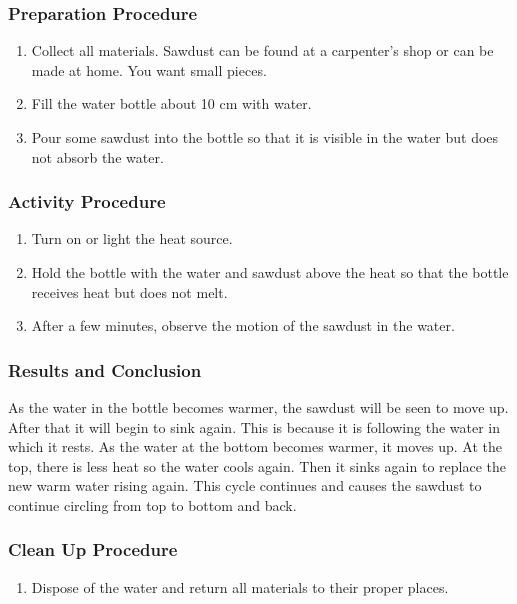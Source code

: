 \subsubsection*{Preparation Procedure}
\begin{enumerate}
\item{Collect all materials.  Sawdust can be found at a carpenter's shop or can be made at home.  You want small pieces.}
\item{Fill the water bottle about 10 cm with water.}
\item{Pour some sawdust into the bottle so that it is visible in the water but does not absorb the water.}
\end{enumerate}

\subsubsection*{Activity Procedure}
\begin{enumerate}
\item{Turn on or light the heat source.}
\item{Hold the bottle with the water and sawdust above the heat so that the bottle receives heat but does not melt.}
\item{After a few minutes, observe the motion of the sawdust in the water.}
\end{enumerate}

\subsubsection*{Results and Conclusion}
As the water in the bottle becomes warmer, the sawdust will be seen to move up.  After that it will begin to sink again.  This is because it is following the water in which it rests.  As the water at the bottom becomes warmer, it moves up.  At the top, there is less heat so the water cools again.  Then it sinks again to replace the new warm water rising again.  This cycle continues and causes the sawdust to continue circling from top to bottom and back.

\subsubsection*{Clean Up Procedure}
\begin{enumerate}
\item{Dispose of the water and return all materials to their proper places.}
\end{enumerate}

